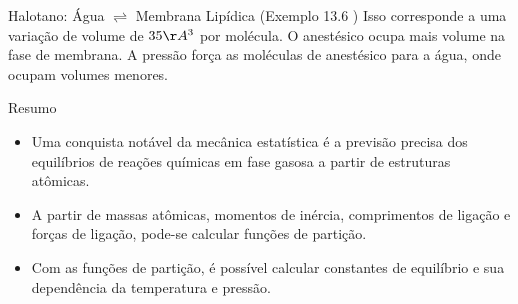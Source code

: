 \documentclass{beamer}
\begin{document}
\begin{frame}{Halotano: Água $\rightleftharpoons$ Membrana Lipídica (Exemplo 13.6 )}
        Isso corresponde a uma variação de volume de $35 \AA^3$ por molécula. O anestésico ocupa mais volume na fase de membrana. A pressão força as moléculas de anestésico para a água, onde ocupam volumes menores.
\end{frame}

\begin{frame}{Resumo}
    \begin{itemize}
        \item Uma conquista notável da mecânica estatística é a previsão precisa dos equilíbrios de reações químicas em fase gasosa a partir de estruturas atômicas.
        \item A partir de massas atômicas, momentos de inércia, comprimentos de ligação e forças de ligação, pode-se calcular funções de partição.
        \item Com as funções de partição, é possível calcular constantes de equilíbrio e sua dependência da temperatura e pressão.
    \end{itemize}
\end{frame}

\end{document}
